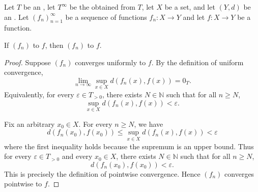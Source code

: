 \begin{proposition} \label{proposition:uniform_convergence_implies_pointwise_convergence_for_sequences_of_functions_to_an_extended_metric_space}
    Let $T$ be an , let $T^\infty$ be the  obtained from $T$, let $X$ be a set, and let $(Y, d)$ be an . Let $(f_n)_{n=1}^\infty$ be a sequence of functions $f_n : X \to Y$ and let $f : X \to Y$ be a function.

    If $(f_n)$  to $f$, then $(f_n)$  to $f$.
\end{proposition}

\begin{proof}
    Suppose $(f_n)$ converges uniformly to $f$. By the definition of uniform convergence,
    $$\lim_{n \to \infty} \sup_{x \in X} d(f_n(x), f(x)) = 0_T.$$
    Equivalently, for every $\varepsilon \in T_{>0}$, there exists $N \in \mathbb{N}$ such that for all $n \geq N$,
    $$\sup_{x \in X} d(f_n(x), f(x)) < \varepsilon.$$

    Fix an arbitrary $x_0 \in X$. For every $n \geq N$, we have
    $$d(f_n(x_0), f(x_0)) \leq \sup_{x \in X} d(f_n(x), f(x)) < \varepsilon$$
    where the first inequality holds because the supremum is an upper bound. Thus for every $\varepsilon \in T_{>0}$ and every $x_0 \in X$, there exists $N \in \mathbb{N}$ such that for all $n \geq N$,
    $$d(f_n(x_0), f(x_0)) < \varepsilon.$$
    This is precisely the definition of pointwise convergence.
    Hence $(f_n)$ converges pointwise to $f$.
\end{proof}
